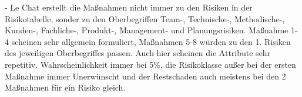         - Le Chat erstellt die Maßnahmen nicht immer zu den Risiken in der Risikotabelle, sonder zu den Oberbegriffen Team-, Technische-, Methodische-, 
        Kunden-, Fachliche-, Produkt-, Management- und Planungsrisiken. Maßnahme 1-4 scheinen sehr allgemein formuliert, Maßnahmen 5-8 würden
        zu den 1. Risiken des jeweiligen Oberbegriffes passen. Auch hier scheinen die Attribute sehr repetitiv. Wahrscheinlichkeit immer bei 5\%,
        die Risikoklasse außer bei der ersten Maßnahme immer Unerwünscht und der Restschaden auch meistens bei den 2 Maßnahmen für ein Risiko gleich.
